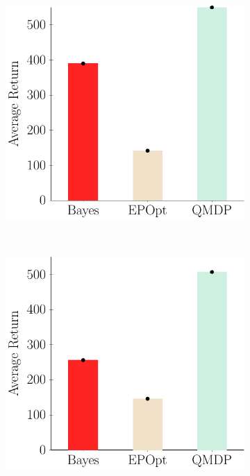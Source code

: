 \documentclass{article}
\begin{document}
\begin{figure}[t!]
\begin{centering}
\begin{subfigure}[b]{0.3\columnwidth}
\includegraphics[width=\linewidth]{figs/cheetah_nominal_comparison.pdf}
\label{fig:nominal}
\end{subfigure}
~
\begin{subfigure}[b]{0.3\columnwidth}
\includegraphics[width=\linewidth]{figs/cheetah_env_comparison.pdf}

\end{subfigure}
\end{centering}
\end{figure}
\end{document}

